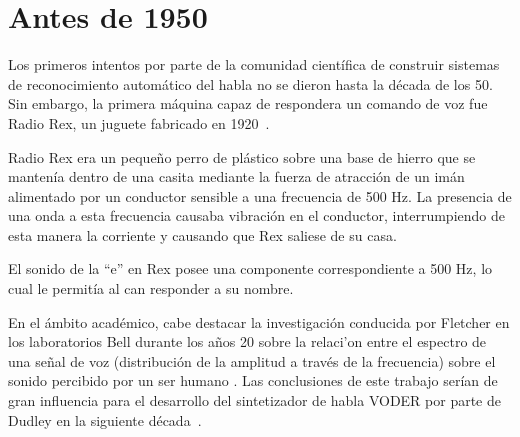 \section{Antes de 1950}
\label{sec:pre50s}

Los primeros intentos por parte de la comunidad cient\'{i}fica de construir sistemas de 
reconocimiento autom\'{a}tico del habla no se dieron hasta la d\'{e}cada de los 50. 
Sin embargo, la primera m\'{a}quina capaz de respondera un comando de voz fue Radio Rex, 
un juguete fabricado en \mbox{1920 \cite{AnusuyaSpeech2009}}.

Radio Rex era un peque\~{n}o perro de pl\'{a}stico sobre una base de hierro que se manten\'{i}a dentro de una casita
mediante la fuerza de atracci\'{o}n de un im\'{a}n alimentado por un conductor sensible a una frecuencia de 500 Hz.
La presencia de una onda a esta frecuencia causaba vibraci\'{o}n en el conductor, interrumpiendo de
esta manera la corriente y causando que Rex saliese de su casa. 

El sonido de la ``e'' en Rex posee una componente correspondiente a 500 Hz, lo cual le permit\'{i}a al can responder a su nombre.

En el \'{a}mbito acad\'{e}mico, cabe destacar la investigaci\'{o}n conducida por Fletcher en los laboratorios Bell
durante los a\~{n}os 20 sobre la relaci'{o}n entre el espectro de una se\~{n}al de voz (distribuci\'{o}n de 
la amplitud a trav\'{e}s de la frecuencia) sobre el sonido percibido por un ser humano \cite{FletcherNature1922}. 
Las conclusiones de este trabajo ser\'{i}an de gran influencia para el desarrollo del sintetizador de habla VODER por parte de Dudley en la siguiente \mbox{d\'{e}cada \cite{JuangAutomaticSpeech}}. 
